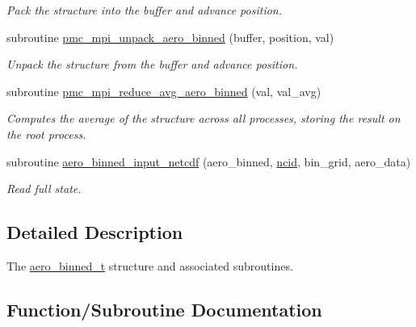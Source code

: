\begin{DoxyCompactItemize}
\begin{DoxyCompactList}\small\item\em Pack the structure into the buffer and advance position. \end{DoxyCompactList}\item 
subroutine \mbox{\hyperlink{namespacepmc__aero__binned_a1bb5126495a6f8750883d78879ab92b6}{pmc\+\_\+mpi\+\_\+unpack\+\_\+aero\+\_\+binned}} (buffer, position, val)
\begin{DoxyCompactList}\small\item\em Unpack the structure from the buffer and advance position. \end{DoxyCompactList}\item 
subroutine \mbox{\hyperlink{namespacepmc__aero__binned_ad66424e22af470ba715c405a5a3e39bf}{pmc\+\_\+mpi\+\_\+reduce\+\_\+avg\+\_\+aero\+\_\+binned}} (val, val\+\_\+avg)
\begin{DoxyCompactList}\small\item\em Computes the average of the structure across all processes, storing the result on the root process. \end{DoxyCompactList}\item 
subroutine \mbox{\hyperlink{namespacepmc__aero__binned_a57434f98c66167e2832149ad51cfdcaa}{aero\+\_\+binned\+\_\+input\+\_\+netcdf}} (aero\+\_\+binned, \mbox{\hyperlink{fractal_8_f90_a4e89f3f850921ff84a6dfce8b166ad50}{ncid}}, bin\+\_\+grid, aero\+\_\+data)
\begin{DoxyCompactList}\small\item\em Read full state. \end{DoxyCompactList}\end{DoxyCompactItemize}


\subsection{Detailed Description}
The \mbox{\hyperlink{structpmc__aero__binned_1_1aero__binned__t}{aero\+\_\+binned\+\_\+t}} structure and associated subroutines. 

\subsection{Function/\+Subroutine Documentation}
\mbox{\label{namespacepmc__aero__binned_a92f2ca0fca2bf061795d607f304fc5f6}} 
